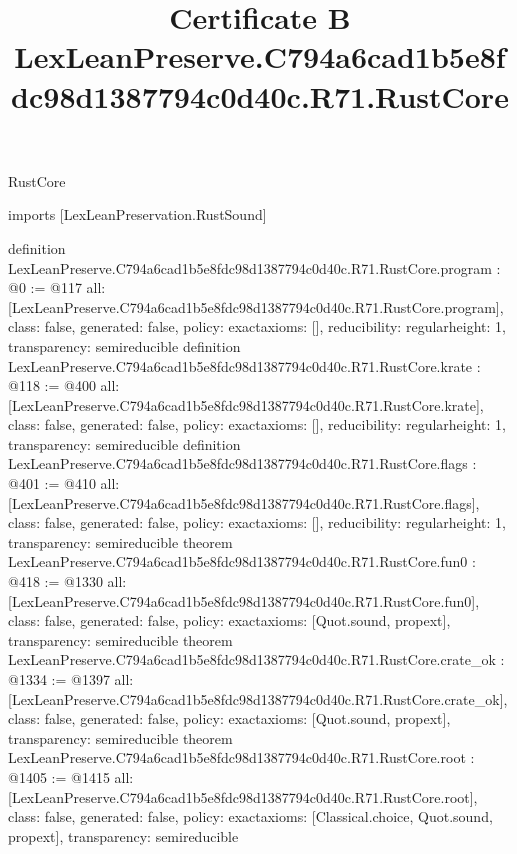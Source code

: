 \begin{lexlean}{RustCore}
\title{Certificate B LexLeanPreserve.C794a6cad1b5e8fdc98d1387794c0d40c.R71.RustCore}
\begin{coremodule}
imports [LexLeanPreservation.RustSound]

definition LexLeanPreserve.C794a6cad1b5e8fdc98d1387794c0d40c.R71.RustCore.program : @0 := @117 {
  all: [LexLeanPreserve.C794a6cad1b5e8fdc98d1387794c0d40c.R71.RustCore.program],
  class: false,
  generated: false,
  policy: exact{axioms: []},
  reducibility: regular{height: 1},
  transparency: semireducible
}
definition LexLeanPreserve.C794a6cad1b5e8fdc98d1387794c0d40c.R71.RustCore.krate : @118 := @400 {
  all: [LexLeanPreserve.C794a6cad1b5e8fdc98d1387794c0d40c.R71.RustCore.krate],
  class: false,
  generated: false,
  policy: exact{axioms: []},
  reducibility: regular{height: 1},
  transparency: semireducible
}
definition LexLeanPreserve.C794a6cad1b5e8fdc98d1387794c0d40c.R71.RustCore.flags : @401 := @410 {
  all: [LexLeanPreserve.C794a6cad1b5e8fdc98d1387794c0d40c.R71.RustCore.flags],
  class: false,
  generated: false,
  policy: exact{axioms: []},
  reducibility: regular{height: 1},
  transparency: semireducible
}
theorem LexLeanPreserve.C794a6cad1b5e8fdc98d1387794c0d40c.R71.RustCore.fun0 : @418 := @1330 {
  all: [LexLeanPreserve.C794a6cad1b5e8fdc98d1387794c0d40c.R71.RustCore.fun0],
  class: false,
  generated: false,
  policy: exact{axioms: [Quot.sound, propext]},
  transparency: semireducible
}
theorem LexLeanPreserve.C794a6cad1b5e8fdc98d1387794c0d40c.R71.RustCore.crate_ok : @1334 := @1397 {
  all: [LexLeanPreserve.C794a6cad1b5e8fdc98d1387794c0d40c.R71.RustCore.crate_ok],
  class: false,
  generated: false,
  policy: exact{axioms: [Quot.sound, propext]},
  transparency: semireducible
}
theorem LexLeanPreserve.C794a6cad1b5e8fdc98d1387794c0d40c.R71.RustCore.root : @1405 := @1415 {
  all: [LexLeanPreserve.C794a6cad1b5e8fdc98d1387794c0d40c.R71.RustCore.root],
  class: false,
  generated: false,
  policy: exact{axioms: [Classical.choice, Quot.sound, propext]},
  transparency: semireducible
}


\end{coremodule}
\end{lexlean}
